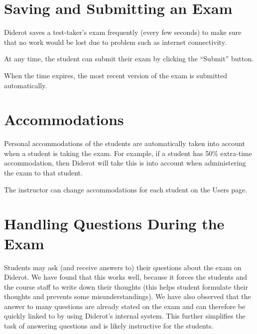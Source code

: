\section{Saving and Submitting an Exam}
\label{ch:quiz::submit}

\begin{cluster}
\label{grp:grm:quiz::saves}

\begin{gram}
\label{grm:quiz::saves}
Diderot saves a test-taker's exam frequently (every few seconds) to make sure that no work would be lost due to problem such as internet connectivity.  

At any time, the student can submit their exam by clicking the ``Submit'' button.

When the time expires, the most recent version of the exam is submitted automatically.

\end{gram}
\end{cluster}


\section{Accommodations}
\label{ch:quiz::accommodations}

\begin{cluster}
\label{grp:grm:quiz::personal}

\begin{gram}
\label{grm:quiz::personal}
Personal accommodations of the students are automatically taken into account when a student is taking the exam.  For example, if a student has 50\% extra-time accommodation, then Diderot will take this is into account when administering the exam to that student.  

The instructor can change accommodations for each student on the Users page. 

\end{gram}
\end{cluster}


\section{Handling Questions During the Exam}
\label{sec:quiz::handling-questions-during-the-exam}

\begin{cluster}
\label{grp:grm:quiz::students}

\begin{gram}
\label{grm:quiz::students}
Students may ask (and receive answers to) their questions about the
exam on Diderot.
We have found that this works well, because it forces the students and
the course staff to write down their thoughts (this helps student
formulate their thoughts and prevents some misunderstandings).
We have also observed that the answer to many questions are already
stated on the exam and can therefore be quickly linked to by using
Diderot's internal  system.
This further simplifies the task of answering questions and is likely
instructive for the students.

\end{gram}
\end{cluster}

